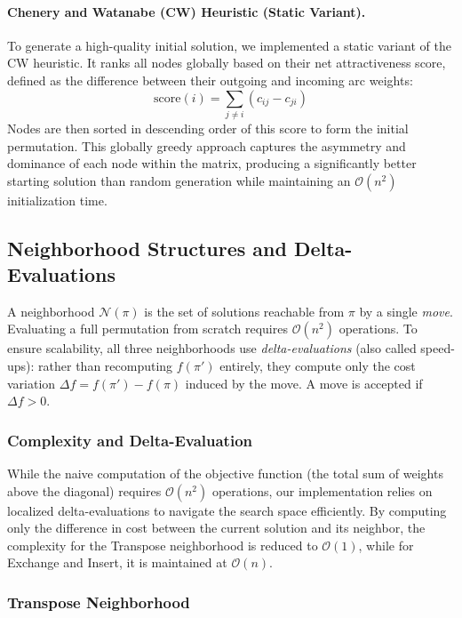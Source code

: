 \documentclass[11pt, a4paper]{article}
\begin{document}
\paragraph{Chenery and Watanabe (CW) Heuristic (Static Variant).} To generate a high-quality initial solution, we implemented a static variant of the CW heuristic. It ranks all nodes globally based on their net attractiveness score, defined as the difference between their outgoing and incoming arc weights:
\begin{equation}
    \text{score}(i) = \sum_{j \neq i} (c_{ij} - c_{ji})
\end{equation}
Nodes are then sorted in descending order of this score to form the initial permutation. This globally greedy approach captures the asymmetry and dominance of each node within the matrix, producing a significantly better starting solution than random generation while maintaining an $\mathcal{O}(n^2)$ initialization time.

\subsection{Neighborhood Structures and Delta-Evaluations}

A neighborhood $\mathcal{N}(\pi)$ is the set of solutions reachable from $\pi$ by a single \emph{move}. Evaluating a full permutation from scratch requires $\mathcal{O}(n^2)$ operations. To ensure scalability, all three neighborhoods use \emph{delta-evaluations} (also called speed-ups): rather than recomputing $f(\pi')$ entirely, they compute only the cost variation $\Delta f = f(\pi') - f(\pi)$ induced by the move. A move is accepted if $\Delta f > 0$.

\subsubsection*{Complexity and Delta-Evaluation}
While the naive computation of the objective function (the total sum of weights above the diagonal) requires $\mathcal{O}(n^2)$ operations, our implementation relies on localized delta-evaluations to navigate the search space efficiently. By computing only the difference in cost between the current solution and its neighbor, the complexity for the Transpose neighborhood is reduced to $\mathcal{O}(1)$, while for Exchange and Insert, it is maintained at $\mathcal{O}(n)$.

\subsubsection{Transpose Neighborhood}
\end{document}
